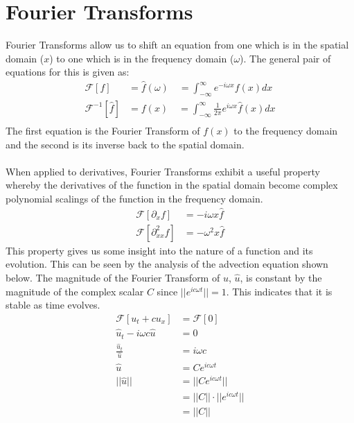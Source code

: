 \section{Fourier Transforms}\label{vna:four}
Fourier Transforms allow us to shift an equation from one which is in the spatial domain ($x$) to one which is in the frequency domain ($\omega$). The general pair of equations for this is given as:
\begin{align*}
 \mathcal{F}[f]			&= \hat{f}(\omega)	\quad= \int_{-\infty}^{\infty} e^{-i \omega x} f(x)dx \\
 \mathcal{F} ^{-1}[\hat{f}]	&= f(x)			\quad= \int_{-\infty}^{\infty} \frac{1}{2\pi} e^{i \omega x} \hat{f}(x)dx \\
\end{align*}
The first equation is the Fourier Transform of $f(x)$ to the frequency domain and the second is its inverse back to the spatial domain.
\\
\\
When applied to derivatives, Fourier Transforms exhibit a useful property whereby the derivatives of the function in the spatial domain become complex polynomial scalings of the function in the frequency domain.
\begin{align*}
  \mathcal{F}[\partial_xf] &= -i\omega x \hat{f}\\
  \mathcal{F}[\partial^2_{xx}f] &= -\omega^2 x \hat{f}
\end{align*}
This property gives us some insight into the nature of a function and its evolution. This can be seen by the analysis of the advection equation shown below. The magnitude of the Fourier Transform of $u$, $\hat{u}$, is constant by the magnitude of the complex scalar $C$ since $||e^{ic \omega t}||	= 1$. This indicates that it is stable as time evolves.
\begin{align*}
  \mathcal{F}[u_t + cu_x ] &= \mathcal{F}[0]	\\
  \hat{u}_t - i \omega c \hat{u} &= 0 	\\
  \frac{\hat{u}_t}{\hat{u}} &= i \omega c	\\
  \hat{u} &= Ce^{ic \omega t}			\\
  ||\hat{u}|| &= ||Ce^{ic \omega t}||		\\
	      &= ||C||\cdot||e^{ic \omega t}||	\\
	      &= ||C||
\end{align*}
